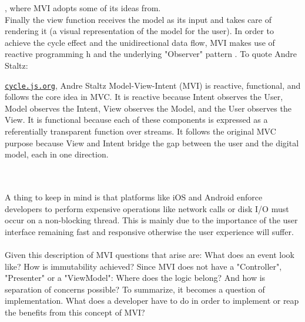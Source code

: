 \cite{functionalProgrammingWikiHaskell,functionalProgrammingPractical,programmingInHaskellFunctionalProgrammingDefinition},
where MVI adopts some of its ideas from.
\\
Finally the view function receives the model as its input and takes care of rendering it (a visual representation of the model for the user). 
In order to achieve the cycle effect and the unidirectional data flow, MVI makes use of reactive programming 
h\cite{reactiveProgrammingIntroAndreStaltz} and the underlying "Observer" pattern \cite{wikipediaObserverPattern}.
To quote Andre Staltz:
\begin{pquotation}{\href{https://cycle.js.org/model-view-intent.html#model-view-intent-what-mvc-is-really-about}{\nolinkurl{cycle.js.org}}, Andre Staltz}
    Model-View-Intent (MVI) is reactive, functional, and follows the core idea in MVC. It is reactive because Intent observes the User, Model observes the Intent, 
    View observes the Model, and the User observes the View. It is functional because each of these components is expressed as a referentially transparent function 
    over streams. It follows the original MVC purpose because View and Intent bridge the gap between the user and the digital model, each in one direction.
\end{pquotation}
\\
\\
A thing to keep in mind is that platforms like iOS and Android enforce developers to perform expensive operations like network calls or disk I/O
\cite{wikipediaIO}
must occur on a non-blocking thread. This is mainly due to the importance of the user interface remaining fast and responsive otherwise the user experience will suffer.
\cite{androidKeepingYourAppResponsive,androidNetworkOnMainThreadException}
\\
\\
Given this description of MVI questions that arise are: What does an event look like? How is immutability achieved?
Since MVI does not have a "Controller", "Presenter" or a "ViewModel": Where does the logic belong? And how is separation of concerns possible?
To summarize, it becomes a question of implementation. What does a developer have to do in order to implement or reap the benefits from this concept of MVI?